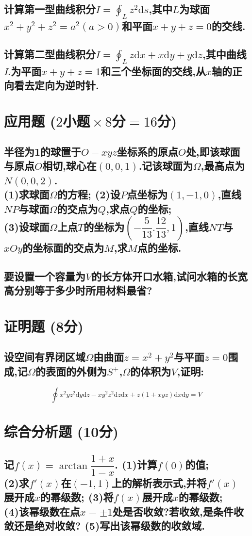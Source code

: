 \documentclass[UTF8]{article}
\newcommand{\ptsMulti}[3]{ \small($#1\!\!$小题$\!\!\times #2\!\!$分$\!\!=\!\!#3\!\!$分)}
\newcommand{\pts}[1]{ \small{(#1分)}}
\newcommand{\ind}{\hspace{-1pt}}
\renewcommand{\d}{\mathrm{d}}
\begin{document}
    \subsection{计算第一型曲线积分$\displaystyle I=\oint_L z^2\d s $,其中$ L $为球面$ x^2+y^2+z^2=a^2(a>0) $和平面$ x+y+z=0 $的交线.}
    \subsection{计算第二型曲线积分$\displaystyle I=\oint_L z\d x+x\d y+y\d z $,其中曲线$ L $为平面$ x+y+z=1 $和三个坐标面的交线,从$ x $轴的正向看去定向为逆时针.}

    \section{应用题\ptsMulti{2}{8}{16}}
    \subsection{\ind
        半径为1的球置于$\!\!O\!-\!xyz\!\!$坐标系的原点$\!O\!$处,\ind 即该球面与原点$\!O\!$相切,\ind 球心在$\!(0,0,1)$.\ind 记该球面为$\!\Omega$,最高点为$\!N(0,0,2)$.\\ 
        (1)求球面$ \Omega $的方程;
        (2)设$ P $点坐标为$ (1,-1,0) $,直线$ NP $与球面$ \Omega $的交点为$ Q $,求点$ Q $的坐标;\\ 
        (3)设球面$ \Omega $上点$ T $的坐标为$ (-\dfrac{5}{13}.\dfrac{12}{13},1) $,直线$ NT $与$ xOy $的坐标面的交点为$ M $,求$ M $点的坐标.
    }
    \subsection{要设置一个容量为$ V $的长方体开口水箱,试问水箱的长宽高分别等于多少时所用材料最省?}

    \section{证明题\pts{8}}
    \subsection{设空间有界闭区域$ \Omega $由曲面$ z=x^2+y^2 $与平面$ z=0 $围成,记$ \Omega $的表面的外侧为$ S^+ $,$ \Omega $的体积为$ V $,证明:}$$ \oint x^2yz^2\d y\d z-xy^2z^2\d z\d x+z(1+xyz)\d x\d y=V $$

    \section{综合分析题\pts{10}}
    \subsection{
        记$ f(x)=\arctan\dfrac{1+x}{1-x} $.
        (1)计算$ f(0) $的值;\\ 
        (2)求$ f'(x) $在$ (-1,1) $上的解析表示式,并将$ f'(x) $展开成$ x $的幂级数;
        (3)将$ f(x) $展开成$ x $的幂级数;\\ 
        (4)该幂级数在点$ x=\pm 1 $处是否收敛?若收敛,是条件收敛还是绝对收敛?
        (5)写出该幂级数的收敛域.
    }
\end{document}
